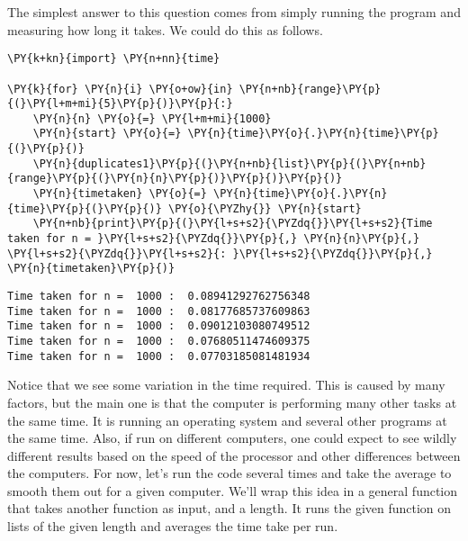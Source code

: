 The simplest answer to this question comes from simply running the program and measuring how long it takes.
We could do this as follows.


\begin{Verbatim}[commandchars=\\\{\}]
\PY{k+kn}{import} \PY{n+nn}{time}

\PY{k}{for} \PY{n}{i} \PY{o+ow}{in} \PY{n+nb}{range}\PY{p}{(}\PY{l+m+mi}{5}\PY{p}{)}\PY{p}{:}
    \PY{n}{n} \PY{o}{=} \PY{l+m+mi}{1000}
    \PY{n}{start} \PY{o}{=} \PY{n}{time}\PY{o}{.}\PY{n}{time}\PY{p}{(}\PY{p}{)}
    \PY{n}{duplicates1}\PY{p}{(}\PY{n+nb}{list}\PY{p}{(}\PY{n+nb}{range}\PY{p}{(}\PY{n}{n}\PY{p}{)}\PY{p}{)}\PY{p}{)}
    \PY{n}{timetaken} \PY{o}{=} \PY{n}{time}\PY{o}{.}\PY{n}{time}\PY{p}{(}\PY{p}{)} \PY{o}{\PYZhy{}} \PY{n}{start}
    \PY{n+nb}{print}\PY{p}{(}\PY{l+s+s2}{\PYZdq{}}\PY{l+s+s2}{Time taken for n = }\PY{l+s+s2}{\PYZdq{}}\PY{p}{,} \PY{n}{n}\PY{p}{,} \PY{l+s+s2}{\PYZdq{}}\PY{l+s+s2}{: }\PY{l+s+s2}{\PYZdq{}}\PY{p}{,} \PY{n}{timetaken}\PY{p}{)}
\end{Verbatim}

\begin{Verbatim}
Time taken for n =  1000 :  0.08941292762756348
Time taken for n =  1000 :  0.08177685737609863
Time taken for n =  1000 :  0.09012103080749512
Time taken for n =  1000 :  0.07680511474609375
Time taken for n =  1000 :  0.07703185081481934
\end{Verbatim}




Notice that we see some variation in the time required.
This is caused by many factors, but the main one is that the computer is performing many other tasks at the same time.
It is running an operating system and several other programs at the same time.
Also, if run on different computers, one could expect to see wildly different results based on the speed of the processor and other differences between the computers.
For now, let's run the code several times and take the average to smooth them out for a given computer.
We'll wrap this idea in a general function that takes another function as input, and a length.
It runs the given function on lists of the given length and averages the time take per run.


